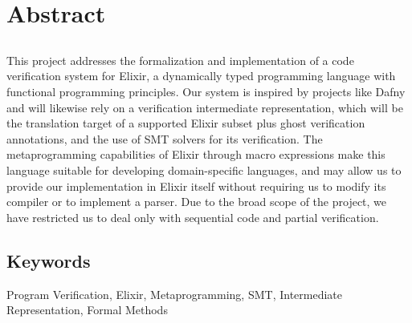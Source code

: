 \chapter*{Abstract}

\section*{\tituloPortadaEngVal}

This project addresses the formalization and implementation of a code
verification system for Elixir, a dynamically typed programming language with
functional programming principles. Our system is inspired by projects like Dafny
and will likewise rely on a verification intermediate representation, which will
be the translation target of a supported Elixir subset plus ghost verification
annotations, and the use of SMT solvers for its verification. The
metaprogramming capabilities of Elixir through macro expressions make this
language suitable for developing domain-specific languages, and may allow us to
provide our implementation in Elixir itself without requiring us to modify its
compiler or to implement a parser. Due to the broad scope of the project, we
have restricted us to deal only with sequential code and partial verification.

\section*{Keywords}

\noindent Program Verification, Elixir, Metaprogramming, SMT, Intermediate Representation, Formal Methods
